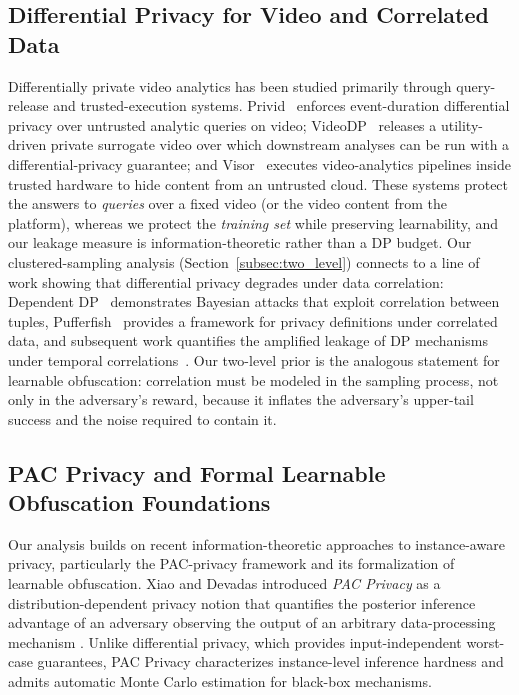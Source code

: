 \documentclass[sigconf,anonymous, review]{acmart}
\begin{document}
\subsection{Differential Privacy for Video and Correlated Data}
\label{subsec:dp_video_related}

Differentially private video analytics has been studied primarily through query-release and trusted-execution systems. Privid~\cite{cangialosi2022privid} enforces event-duration differential privacy over untrusted analytic queries on video; VideoDP~\cite{wang2019videodp} releases a utility-driven private surrogate video over which downstream analyses can be run with a differential-privacy guarantee; and Visor~\cite{visor2020usenix} executes video-analytics pipelines inside trusted hardware to hide content from an untrusted cloud. These systems protect the answers to \emph{queries} over a fixed video (or the video content from the platform), whereas we protect the \emph{training set} while preserving learnability, and our leakage measure is information-theoretic rather than a DP budget. Our clustered-sampling analysis (Section~\ref{subsec:two_level}) connects to a line of work showing that differential privacy degrades under data correlation: Dependent DP~\cite{liu2016dependence} demonstrates Bayesian attacks that exploit correlation between tuples, Pufferfish~\cite{kifer2014pufferfish} provides a framework for privacy definitions under correlated data, and subsequent work quantifies the amplified leakage of DP mechanisms under temporal correlations~\cite{cao2017temporal}. Our two-level prior is the analogous statement for learnable obfuscation: correlation must be modeled in the sampling process, not only in the adversary's reward, because it inflates the adversary's upper-tail success and the noise required to contain it.

\subsection{PAC Privacy and Formal Learnable Obfuscation Foundations}

Our analysis builds on recent information-theoretic approaches to instance-aware privacy, particularly the PAC-privacy framework and its formalization of learnable obfuscation. Xiao and Devadas introduced \emph{PAC Privacy} as a distribution-dependent privacy notion that quantifies the posterior inference advantage of an adversary observing the output of an arbitrary data-processing mechanism \cite{xiao2023pacprivacy}. Unlike differential privacy, which provides input-independent worst-case guarantees, PAC Privacy characterizes instance-level inference hardness and admits automatic Monte Carlo estimation for black-box mechanisms.
\end{document}
